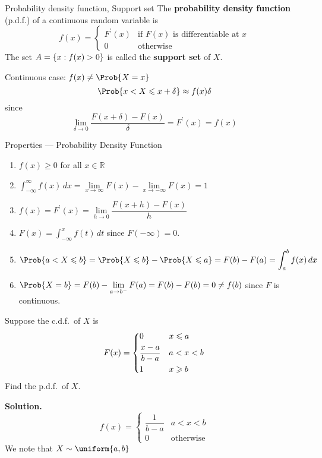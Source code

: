 \begin{Definition}{Probability density function, Support set}{}
    The \textbf{probability density function} (p.d.f.) of a continuous random variable
    is
    \[ f(x)=\begin{cases}
            F^\prime(x) & \text{if }F(x)\text{ is differentiable at }x \\
            0           & \text{otherwise}
        \end{cases} \]
    The set $ A=\{x:f(x)>0\} $ is called the \textbf{support set}
    of $ X $.
\end{Definition}

Continuous case: $ f(x)\neq \Prob{X=x} $
\[ \Prob{x<X\leqslant x+\delta}\approx f(x)\delta \]
since
\[ \lim\limits_{{\delta} \to {0}}\frac{F(x+\delta)-F(x)}{\delta}=F^\prime(x)=f(x) \]
\begin{Definition}{Properties --- Probability Density Function}{}
    \begin{enumerate}[label=(\Roman*)]
        \item $ f(x)\geqslant 0 $ for all $ x\in\mathbb{R} $
        \item $ \displaystyle \int_{-\infty}^{\infty} f(x)\, d{x} =
                  \lim\limits_{{x} \to {\infty}} F(x)-
                  \lim\limits_{{x} \to {-\infty}} F(x)= 1 $
        \item $ f(x)=F^\prime(x)=
                  \lim\limits_{{h} \to {0}} \dfrac{F(x+h)-F(x)}{h} $
        \item $ F(x)=\displaystyle \int_{-\infty}^{x} f(t)\, d{t} $
              since $ F(-\infty)=0 $.
        \item $ \Prob{a< X\leqslant b}=\Prob{X\leqslant b}-
                  \Prob{X\leqslant a}=F(b)-F(a)
                  =\displaystyle \int_{a}^{b} f(x)\, d{x}  $
        \item $ \Prob{X=b}=F(b)-\lim\limits_{{a} \to {b^-}}
                  F(a)=F(b)-F(b) =0\neq f(b) $ since $ F $ is continuous.
    \end{enumerate}
\end{Definition}

\begin{Example}{}{}
    Suppose the c.d.f.\ of $ X $ is
    \[ F(x)=\begin{dcases}
            0               & x\leqslant a \\
            \frac{x-a}{b-a} & a<x<b        \\
            1               & x\geqslant b
        \end{dcases} \]
    Find the p.d.f.\ of $ X $.

    \textbf{Solution.}
    \[ f(x)=
        \begin{cases}
            \dfrac{1}{b-a} & a<x<b            \\
            0              & \text{otherwise}
        \end{cases} \]
    We note that $ X \sim \uniform{a,b} $
\end{Example}

